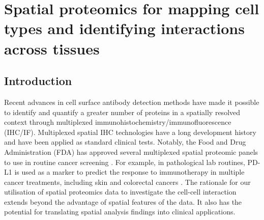 \chapter[Spatial proteomics for mapping cell types and identifying interactions across tissues]{Spatial proteomics for mapping cell types and identifying interactions across tissues}
\label{Chap:3}	%
\pagestyle{headings}
\section{Introduction }
\label{Sec:3.1_intro}
Recent advances in cell surface antibody detection methods have made it possible to identify and quantify a greater number of proteins in a spatially resolved context through multiplexed immunohistochemistry/immunofluorescence (IHC/IF). Multiplexed spatial IHC technologies have a long development history and have been applied as standard clinical tests. Notably, the Food and Drug Administration (FDA) has approved several multiplexed spatial proteomic panels to use in routine cancer screening \cite{van2021multiplexed, hawes2009immunohistochemistry, decalf2019new}. For example, in pathological lab routines, PD-L1 is used as a marker to predict the response to immunotherapy in multiple cancer treatments, including skin and colorectal cancers \cite{van2021multiplexed}. The rationale for our utilisation of spatial proteomics data to investigate the cell-cell interaction extends beyond the advantage of spatial features of the data. It also has the potential for translating spatial analysis findings into clinical applications.

